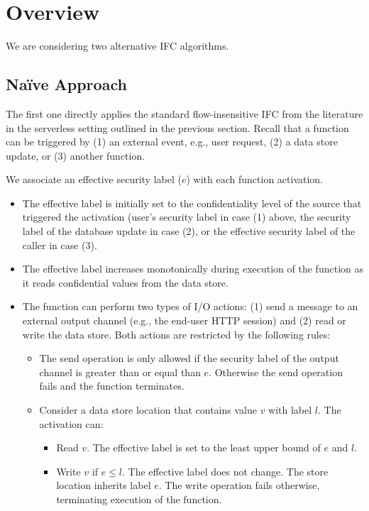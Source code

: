 \section{Overview} %
\label{sec:overview}
We are considering two alternative IFC algorithms.

\subsection{Na\"ive Approach} %
\label{sub:naive_approach}

The first one directly applies the standard flow-insensitive IFC from the literature in the serverless setting outlined in the previous section. Recall that a function can be triggered by (1) an external event, e.g., user request, (2) a data store update, or (3) another function.

We associate an effective security label ($e$) with each function activation.
\begin{itemize}
    \item The effective label is initially set to the confidentiality level of the source that triggered the activation (user's security label in case (1) above, the security label of the database update in case (2), or the effective security label of the caller in case (3).

    \item The effective label increases monotonically during execution of the function as it reads confidential values from the data store.

    \item The function can perform two types of I/O actions: (1) send a message to an external output channel (e.g., the end-user HTTP session) and (2) read or write the data store. Both actions are restricted by the following rules:

    \begin{itemize}
        \item The send operation is only allowed if the security label of the output channel is greater than or equal than $e$. Otherwise the send operation fails and the function terminates.

        \item Consider a data store location that contains value $v$ with label $l$. The activation can:
        \begin{itemize}
            \item Read $v$. The effective label is set to the least upper bound of $e$ and $l$.

            \item Write $v$ if $e \leq l$. The effective label does not change. The store location inherits label $e$. The write operation fails otherwise, terminating execution of the function.
        \end{itemize}
    \end{itemize}
\end{itemize}

